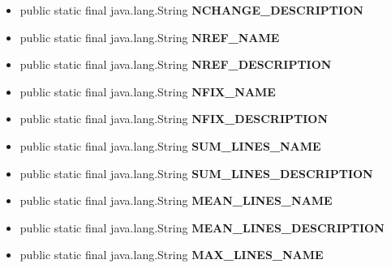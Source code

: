 {{{\begin{itemize}
{}
\item{
\label{it.unisa.sesa.repominer.db.entities.Metric.NCHANGE_DESCRIPTION}\hypertarget{it.unisa.sesa.repominer.db.entities.Metric.NCHANGE_DESCRIPTION}{public static final java.lang.String {\bf  NCHANGE\_DESCRIPTION}}
}
\item{
\label{it.unisa.sesa.repominer.db.entities.Metric.NREF_NAME}\hypertarget{it.unisa.sesa.repominer.db.entities.Metric.NREF_NAME}{public static final java.lang.String {\bf  NREF\_NAME}}
}
\item{
\label{it.unisa.sesa.repominer.db.entities.Metric.NREF_DESCRIPTION}\hypertarget{it.unisa.sesa.repominer.db.entities.Metric.NREF_DESCRIPTION}{public static final java.lang.String {\bf  NREF\_DESCRIPTION}}
}
\item{
\label{it.unisa.sesa.repominer.db.entities.Metric.NFIX_NAME}\hypertarget{it.unisa.sesa.repominer.db.entities.Metric.NFIX_NAME}{public static final java.lang.String {\bf  NFIX\_NAME}}
}
\item{
\label{it.unisa.sesa.repominer.db.entities.Metric.NFIX_DESCRIPTION}\hypertarget{it.unisa.sesa.repominer.db.entities.Metric.NFIX_DESCRIPTION}{public static final java.lang.String {\bf  NFIX\_DESCRIPTION}}
}
\item{
\label{it.unisa.sesa.repominer.db.entities.Metric.SUM_LINES_NAME}\hypertarget{it.unisa.sesa.repominer.db.entities.Metric.SUM_LINES_NAME}{public static final java.lang.String {\bf  SUM\_LINES\_NAME}}
}
\item{
\label{it.unisa.sesa.repominer.db.entities.Metric.SUM_LINES_DESCRIPTION}\hypertarget{it.unisa.sesa.repominer.db.entities.Metric.SUM_LINES_DESCRIPTION}{public static final java.lang.String {\bf  SUM\_LINES\_DESCRIPTION}}
}
\item{
\label{it.unisa.sesa.repominer.db.entities.Metric.MEAN_LINES_NAME}\hypertarget{it.unisa.sesa.repominer.db.entities.Metric.MEAN_LINES_NAME}{public static final java.lang.String {\bf  MEAN\_LINES\_NAME}}
}
\item{
\label{it.unisa.sesa.repominer.db.entities.Metric.MEAN_LINES_DESCRIPTION}\hypertarget{it.unisa.sesa.repominer.db.entities.Metric.MEAN_LINES_DESCRIPTION}{public static final java.lang.String {\bf  MEAN\_LINES\_DESCRIPTION}}
}
\item{
\label{it.unisa.sesa.repominer.db.entities.Metric.MAX_LINES_NAME}\hypertarget{it.unisa.sesa.repominer.db.entities.Metric.MAX_LINES_NAME}{public static final java.lang.String {\bf  MAX\_LINES\_NAME}}
}
\end{itemize}}}}
